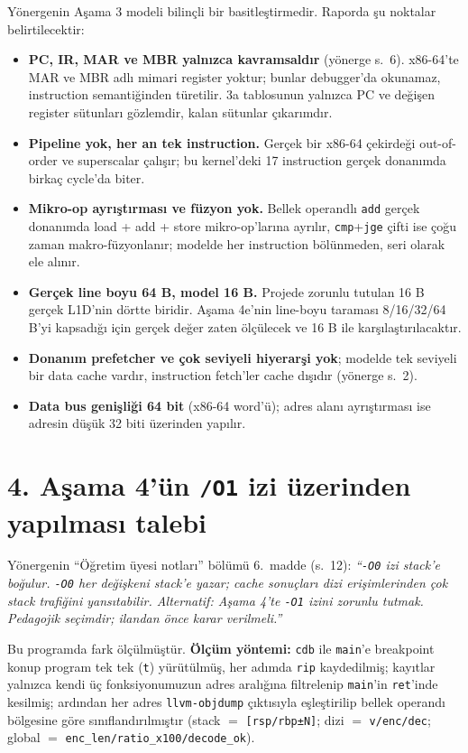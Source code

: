 \documentclass[11pt,a4paper]{article}
\newcommand{\tl}{\texttt}
\begin{document}
Yönergenin Aşama 3 modeli bilinçli bir basitleştirmedir. Raporda şu noktalar belirtilecektir:

\begin{itemize}
\item \textbf{PC, IR, MAR ve MBR yalnızca kavramsaldır} (yönerge s.~6). x86-64'te MAR ve MBR adlı
mimari register yoktur; bunlar debugger'da okunamaz, instruction semantiğinden türetilir.
3a tablosunun yalnızca PC ve değişen register sütunları gözlemdir, kalan sütunlar çıkarımdır.
\item \textbf{Pipeline yok, her an tek instruction.} Gerçek bir x86-64 çekirdeği out-of-order ve
superscalar çalışır; bu kernel'deki 17 instruction gerçek donanımda birkaç cycle'da biter.
\item \textbf{Mikro-op ayrıştırması ve füzyon yok.} Bellek operandlı \tl{add} gerçek donanımda
load + add + store mikro-op'larına ayrılır, \tl{cmp}+\tl{jge} çifti ise çoğu zaman
makro-füzyonlanır; modelde her instruction bölünmeden, seri olarak ele alınır.
\item \textbf{Gerçek line boyu 64 B, model 16 B.} Projede zorunlu tutulan 16 B gerçek L1D'nin
dörtte biridir. Aşama 4e'nin line-boyu taraması 8/16/32/64 B'yi kapsadığı için gerçek değer
zaten ölçülecek ve 16 B ile karşılaştırılacaktır.
\item \textbf{Donanım prefetcher ve çok seviyeli hiyerarşi yok}; modelde tek seviyeli bir data
cache vardır, instruction fetch'ler cache dışıdır (yönerge s.~2).
\item \textbf{Data bus genişliği 64 bit} (x86-64 word'ü); adres alanı ayrıştırması ise adresin
düşük 32 biti üzerinden yapılır.
\end{itemize}

\section*{4. Aşama 4'ün \tl{/O1} izi üzerinden yapılması talebi}

Yönergenin ``Öğretim üyesi notları'' bölümü 6.~madde (s.~12): \textit{``\tl{-O0} izi stack'e
boğulur. \tl{-O0} her değişkeni stack'e yazar; cache sonuçları dizi erişimlerinden çok stack
trafiğini yansıtabilir. Alternatif: Aşama 4'te \tl{-O1} izini zorunlu tutmak. Pedagojik
seçimdir; ilandan önce karar verilmeli.''}

Bu programda fark ölçülmüştür. \textbf{Ölçüm yöntemi:} \tl{cdb} ile \tl{main}'e breakpoint konup
program tek tek (\tl{t}) yürütülmüş, her adımda \tl{rip} kaydedilmiş; kayıtlar yalnızca kendi üç
fonksiyonumuzun adres aralığına filtrelenip \tl{main}'in \tl{ret}'inde kesilmiş; ardından her
adres \tl{llvm-objdump} çıktısıyla eşleştirilip bellek operandı bölgesine göre sınıflandırılmıştır
(stack $=$ \tl{[rsp/rbp±N]}; dizi $=$ \tl{v/enc/dec}; global $=$ \tl{enc\_len/ratio\_x100/decode\_ok}).
\end{document}
